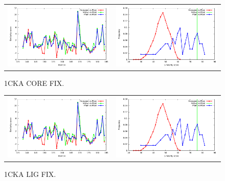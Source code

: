 \documentclass[a4paper,12pt]{article}
\begin{document}
   \begin{figure}[t]
     \centering
     \begin{tabular}{cc}
       \includegraphics[width=8.45cm]{1CKA_CORE_FIX_simil_bypos.pdf} &
       \includegraphics[width=8.45cm]{1CKA_CORE_FIX_simil_byseq.pdf} \\
     \end{tabular}
     
     \caption{1CKA CORE FIX.}
     \label{fig-seqlogo-T=03}
   \end{figure}

   \begin{figure}[t]
     \centering
     \begin{tabular}{cc}
       \includegraphics[width=8.45cm]{1CKA_LIG_FIX_simil_bypos.pdf} &
       \includegraphics[width=8.45cm]{1CKA_LIG_FIX_simil_byseq.pdf} \\
     \end{tabular}
     
     \caption{1CKA LIG FIX.}
   \end{figure}
\end{document}
